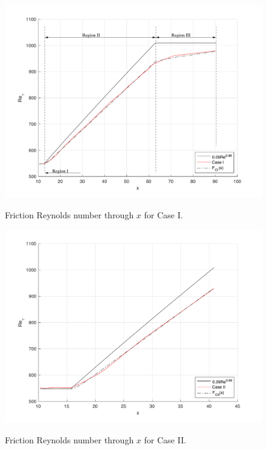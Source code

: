 \documentclass[twocolumn,10pt]{asme2e}
\begin{document}
\begin{figure}[t]
\centering
\scalebox{0.42}
{\includegraphics{convolution_CI.pdf}}
\caption{Friction Reynolds number through \(x\) for Case I.}
\label{fig:convolution_CI}
\end{figure}

\begin{figure}[t]
\centering
\scalebox{0.5}
{\includegraphics{convolution_CII.pdf}}
\caption{Friction Reynolds number through \(x\) for Case II.}
\label{fig:convolution_CII}
\end{figure}
\end{document}
